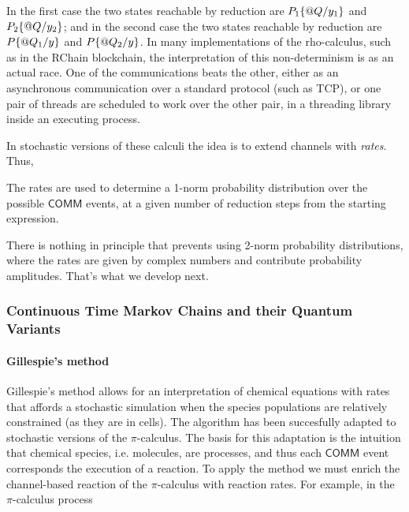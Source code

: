 
In the first case the two states reachable by reduction are
$P_{1}\{ \mathsf{@} Q / y_{1} \}$ and
$P_{2}\{ \mathsf{@} Q / y_{2} \}$; and in the second case the two
states reachable by reduction are $P\{ \mathsf{@} Q_{1} / y \}$ and
$P\{ \mathsf{@} Q_{2} / y \}$. In many implementations of the
rho-calculus, such as in the RChain blockchain, the interpretation of
this non-determinism is as an actual race. One of the communications
beats the other, either as an asynchronous communication over a
standard protocol (such as TCP), or one pair of threads are scheduled
to work over the other pair, in a threading library inside an
executing process.

In stochastic versions of these calculi the idea is to extend channels
with \emph{rates}. Thus,


The rates are used to determine a 1-norm probability distribution over
the possible $\mathsf{COMM}$ events, at a given number of reduction
steps from the starting expression.

There is nothing in principle that prevents using 2-norm probability
distributions, where the rates are given by complex numbers and
contribute probability amplitudes. That's what we develop next.

\subsubsection{Continuous Time Markov Chains and their Quantum Variants}
\paragraph{Gillespie's method}
Gillespie's method \cite{ADS:ARPC/Gillespie2007} allows for an interpretation
of chemical equations with rates that affords a stochastic simulation
when the species populations are relatively constrained (as they are
in cells). The algorithm has been succesfully adapted to stochastic
versions of the $\pi$-calculus. The basis for this adaptation is the
intuition that chemical species, i.e. molecules, are processes, and
thus each $\mathsf{COMM}$ event corresponds the execution of a
reaction. To apply the method we must enrich the channel-based
reaction of the $\pi$-calculus with reaction rates. For example, in
the $\pi$-calculus process

